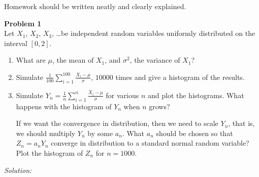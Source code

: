 \documentclass{article}
\newenvironment{problem}[2][Problem]
    { \begin{mdframed}[backgroundcolor=gray!20] \textbf{#1 #2} \\}
    {  \end{mdframed}}
\newenvironment{solution}
    {\textit{Solution:}}
    {}
\begin{document}
\begin{mdframed}[backgroundcolor=blue!20]
Homework should be written neatly and clearly explained. 
\end{mdframed}


\begin{problem}{1}
Let $X_1$, $X_2$, $X_3$, \ldots be independent random variables uniformly distributed on the interval $[0, 2]$.
\begin{enumerate}
\item
What are $\mu$, the mean of $X_1$, and $\sigma^2$, the variance of $X_1$?
\item
Simulate $\frac{1}{100} \sum_{i = 1}^{100} \frac{X_i - \mu}{\sigma}$, $10000$ times and give a histogram of the results.
\item 
Simulate $Y_n = \frac{1}{n} \sum_{i = 1}^{n} \frac{X_i - \mu}{\sigma}$ for various $n$ and plot the histograms. What happens with the histogram of $Y_n$ when $n$ grows? 

If we want the convergence in distribution, then we need to scale $Y_n$, that is, we should multiply $Y_n$ by some $a_n$. What $a_n$ should be chosen so that $Z_n = a_n Y_n$ converge in distribution to a standard normal random variable? Plot the histogram of $Z_n$ for $n = 1000$. 
 \end{enumerate}
\end{problem}

\begin{solution}

\end{solution}




 
\end{document}
